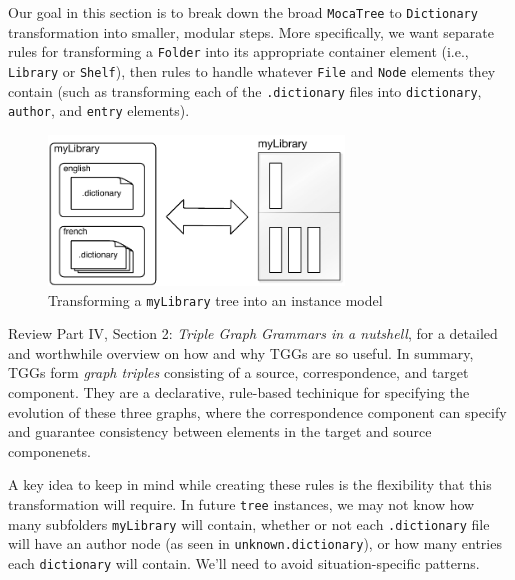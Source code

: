 Our goal in this section is to break down the broad \texttt{MocaTree} to \texttt{Dictionary} transformation into smaller, modular steps. More specifically, we
want separate rules for transforming a \texttt{Folder} into its appropriate container element (i.e., \texttt{Library} or \texttt{Shelf}), then rules to
handle whatever \texttt{File} and \texttt{Node} elements they contain (such as transforming each of the \texttt{.dictionary} files into
\texttt{dictionary}, \texttt{author}, and \texttt{entry} elements).

\vspace{0.5cm}

\begin{figure}[htp]
\begin{center}
  \includegraphics[width=0.7\textwidth]{treeToDictionaryTransformation}
  \caption{Transforming a \texttt{myLibrary} tree into an instance model}
  \label{fig:treeToDictionary}
\end{center}
\end{figure}

\vspace{0.5cm}

Review Part IV, Section 2: \emph{Triple Graph Grammars in a nutshell}, for a detailed and worthwhile overview on how and why TGGs are so useful. In summary,
TGGs form \emph{graph triples} consisting of a source, correspondence, and target component. They are a declarative, rule-based techinique for specifying
the evolution of these three graphs, where the correspondence component can specify and guarantee consistency between elements in the target and source
componenets.

\vspace{0.5cm}

A key idea to keep in mind while creating these rules is the flexibility that this transformation will require. In future \texttt{tree} instances, we may not
know how many subfolders \texttt{myLibrary} will contain, whether or not each \texttt{.dictionary} file will have an author node (as seen in
\texttt{unknown.dictionary}), or how many entries each \texttt{dictionary} will contain. We'll need to avoid situation-specific patterns.


